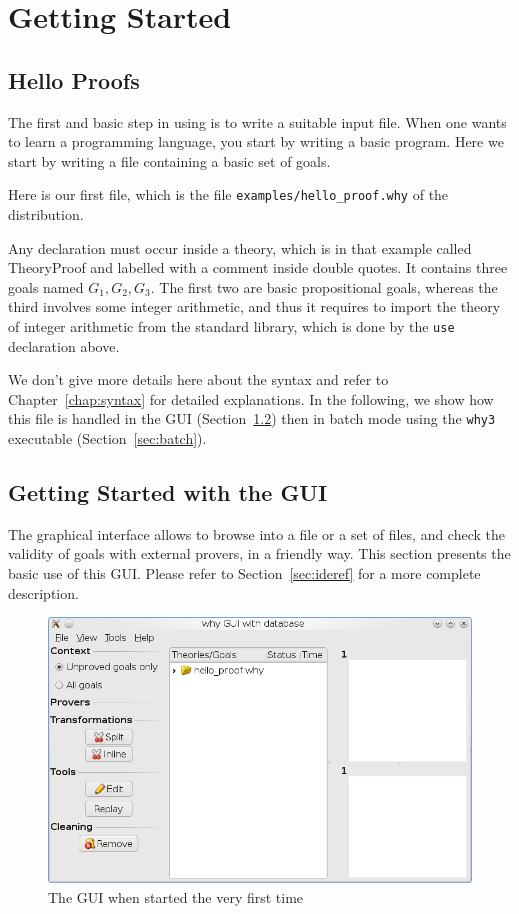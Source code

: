 \chapter{Getting Started}
\label{chap:starting}

\section{Hello Proofs}

The first and basic step in using \why is to write a suitable input
file. When one wants to learn a programming language, you start by
writing a basic program. Here we start by writing a file containing a
basic set of goals.

Here is our first \why file, which is the file
\texttt{examples/hello\_proof.why} of the distribution.


Any declaration must occur
inside a theory, which is in that example called TheoryProof and
labelled with a comment inside double quotes. It contains three goals
named $G_1,G_2,G_3$. The first two are basic propositional goals,
whereas the third involves some integer arithmetic, and thus it
requires to import the theory of integer arithmetic from the \why
standard library, which is done by the \texttt{use} declaration above.

We don't give more details here about the syntax and refer to
Chapter~\ref{chap:syntax} for detailed explanations. In the following,
we show how this file is handled in the \why GUI
(Section~\ref{sec:gui}) then in batch mode using the \texttt{why3}
executable (Section~\ref{sec:batch}).


\section{Getting Started with the GUI}
\label{sec:gui}

The graphical interface allows to browse into a file or a set of
files, and check the validity of goals with external provers, in a
friendly way. This section presents the basic use of this GUI. Please
refer to Section~\ref{sec:ideref} for a more complete description.

\begin{figure}[tbp]
  \includegraphics[width=\textwidth]{gui1.png}
  \caption{The GUI when started the very first time}
  \label{fig:gui1}
\end{figure}

